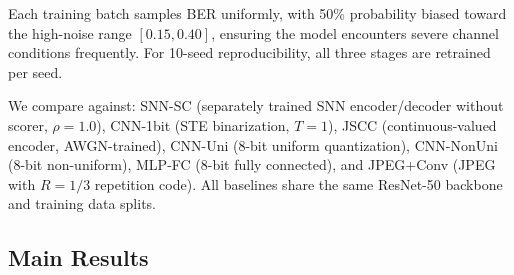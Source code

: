 \documentclass[conference]{IEEEtran}
\begin{document}
Each training batch samples BER uniformly, with 50\% probability biased toward the high-noise range $[0.15, 0.40]$, ensuring the model encounters severe channel conditions frequently. For 10-seed reproducibility, all three stages are retrained per seed.

We compare against: SNN-SC (separately trained SNN encoder/decoder without scorer, $\rho{=}1.0$), CNN-1bit (STE binarization, $T{=}1$), JSCC (continuous-valued encoder, AWGN-trained), CNN-Uni (8-bit uniform quantization), CNN-NonUni (8-bit non-uniform), MLP-FC (8-bit fully connected), and JPEG+Conv (JPEG with $R{=}1/3$ repetition code). All baselines share the same ResNet-50 backbone and training data splits.

\subsection{Main Results}
\end{document}

